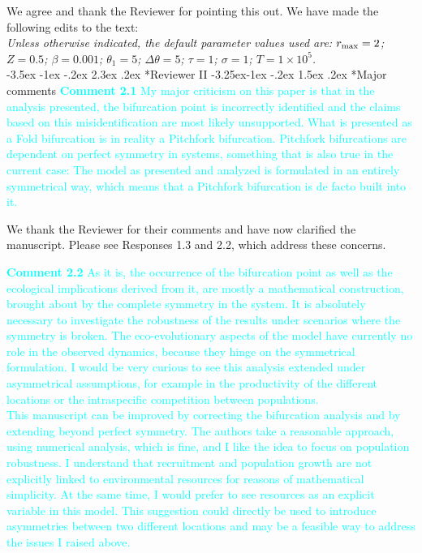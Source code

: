 \documentclass[ucm,12pt]{ucletter}
\makeatletter
\newcounter{section}
\newcounter{subsection}[section]
\renewcommand\section{\@startsection {section}{1}{\z@}%
                                   {-3.5ex \@plus -1ex \@minus -.2ex}%
                                   {2.3ex \@plus.2ex}%
                                   {\normalfont\Large\bfseries}}
\newcommand\subsection{\@startsection{subsection}{2}{\z@}%
                                     {-3.25ex\@plus -1ex \@minus -.2ex}%
                                     {1.5ex \@plus .2ex}%
                                     {\normalfont\large\bfseries}}
\makeatother
\begin{document}
\begin{letter}
 We agree and thank the Reviewer for pointing this out. We have made the following edits to the text:\\
 \emph{Unless otherwise indicated, the default parameter values used are: $r_{\rm max}=2$; $Z=0.5$; $\beta=0.001$; $\theta_1=5$; $\Delta\theta=5$; $\tau=1$; $\sigma=1$; $T=1\times10^5$.}\\


\section*{Reviewer II}
\subsection*{Major comments}
\noindent \textcolor{cyan}{
{\bf Comment 2.1} My major criticism on this paper is that in the analysis presented, the bifurcation point is incorrectly identified and the claims based on this misidentification are most likely unsupported. What is presented as a Fold bifurcation is in reality a Pitchfork bifurcation. Pitchfork bifurcations are dependent on perfect symmetry in systems, something that is also true in the current case: The model as presented and analyzed is formulated in an entirely symmetrical way, which means that a Pitchfork bifurcation is de facto built into it.
}

 We thank the Reviewer for their comments and have now clarified the manuscript. Please see Responses 1.3 and 2.2, which address these concerns.

\noindent \textcolor{cyan}{
{\bf Comment 2.2} As it is, the occurrence of the bifurcation point as well as the ecological implications derived from it, are mostly a mathematical construction, brought about by the complete symmetry in the system. It is absolutely necessary to investigate the robustness of the results under scenarios where the symmetry is broken. The eco-evolutionary aspects of the model have currently no role in the observed dynamics, because they hinge on the symmetrical formulation.
I would be very curious to see this analysis extended under asymmetrical assumptions, for example in the productivity of the different locations or the intraspecific competition between populations.
\\
This manuscript can be improved by correcting the bifurcation analysis and by extending beyond perfect symmetry. The authors take a reasonable approach, using numerical analysis, which is fine, and I like the idea to focus on population robustness.  I understand that recruitment and population growth are not explicitly linked to environmental resources for reasons of mathematical simplicity. At the same time, I would prefer to see resources as an explicit variable in this model. This suggestion could directly be used to introduce asymmetries between two different locations and may be a feasible way to address the issues I raised above.
}


\end{letter}
\end{document}
